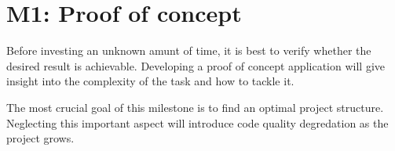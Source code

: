 \chapter{M1: Proof of concept}

Before investing an unknown amunt of time, it is best to verify whether the desired result is achievable. Developing a proof of concept application will give insight into the complexity of the task and how to tackle it.

The most crucial goal of this milestone is to find an optimal project structure. Neglecting this important aspect will introduce code quality degredation as the project grows.